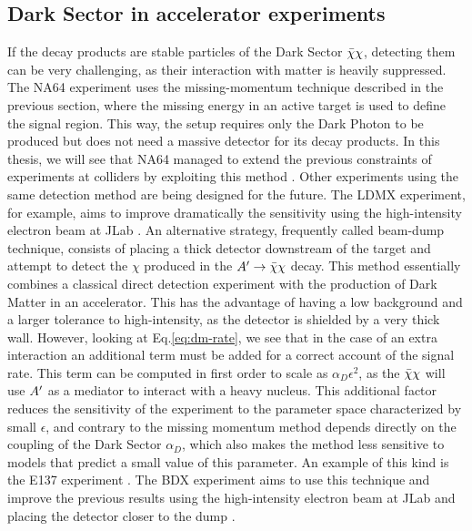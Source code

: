   \subsection{Dark Sector in accelerator experiments}

If the decay products are stable particles of the Dark Sector $\bar{\chi} \chi$, detecting them can be very challenging, as their interaction with matter is heavily suppressed. The NA64 experiment uses the missing-momentum technique described in the previous section, where the missing energy in an active target is used to define the signal region. This way, the setup requires only the Dark Photon to be produced but does not need a massive detector for its decay products. In this thesis, we will see that NA64 managed to extend the previous constraints of experiments at colliders by exploiting this method \cite{NA64:2019imj}. Other experiments using the same detection method are being designed for the future. The LDMX experiment, for example, aims to improve dramatically the sensitivity using the high-intensity electron beam at JLab \cite{Moreno:2019tfm}. An alternative strategy, frequently called beam-dump technique, consists of placing a thick detector downstream of the target and attempt to detect the $\chi$ produced in the $A' \to \bar{\chi} \chi$ decay. This method essentially combines a classical direct detection experiment with the production of Dark Matter in an accelerator. This has the advantage of having a low background and a larger tolerance to high-intensity, as the detector is shielded by a very thick wall. However, looking at Eq.\ref{eq:dm-rate}, we see that in the case of an extra interaction an additional term must be added for a correct account of the signal rate. This term can be computed in first order to scale as $\alpha_D \epsilon^2$, as the $\bar{\chi} \chi$ will use $A'$ as a mediator to interact with a heavy nucleus. This additional factor reduces the sensitivity of the experiment to the parameter space characterized by small $\epsilon$, and contrary to the missing momentum method depends directly on the coupling of the Dark Sector $\alpha_D$, which also makes the method less sensitive to models that predict a small value of this parameter. An example of this kind is the E137 experiment \cite{e137}. The BDX experiment aims to use this technique and improve the previous results using the high-intensity electron beam at JLab and placing the detector closer to the dump \cite{Battaglieri:2019nok}.

